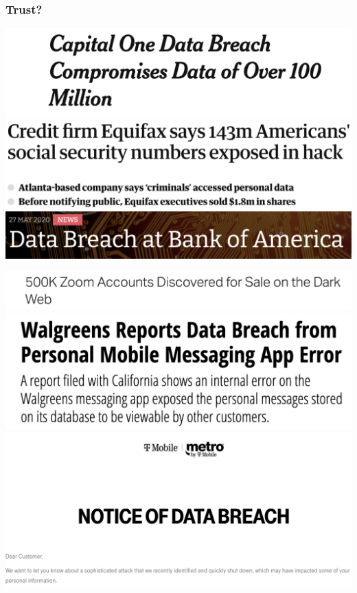 \documentclass{beamer}
\begin{document}
\begin{frame}
  \frametitle{Trust?}
  \centering
	\includegraphics[scale=0.25]{capitalone}
	\includegraphics[scale=0.25]{equifax} 
	\includegraphics[scale=0.25]{bank}
	\pause
	
	\includegraphics[scale=0.2]{zoom}
	\includegraphics[scale=0.2]{walgreens}
	\includegraphics[scale=0.15]{metro}
\end{frame}
\end{document}
